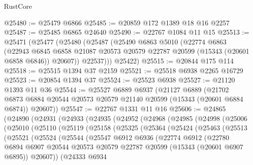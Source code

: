 \begin{lexlean}{RustCore}
\begin{coremodule}
@25480 := @25479 @6866
@25485 := @20859 @172 @1389 @18 @16 @2257
@25487 := @25485 @6865 @24640
@25490 := @22767 @1084 @11 @15
@25513 := @25471
    (@25477
      (@25480
        (@25487
          (@25490
            @6863
            @5010
            (@22774
              @6863
              (@22943
                @6845
                @6858
                @21087
                @20573
                @20579
                @22787
                @20599
                (@15343 (@20601 @6858 @6846))
                @20607))
            @22537)))
      @25422)
@25515 := @20844 @175 @114
@25518 := @25515 @1394 @37 @2159
@25521 := @25518 @6938 @2265 @16729
@25523 := @20854 @1394 @37
@25524 := @25523 @6938
@25527 := @21120 @1393 @11 @36
@25544 := @25527
    @6889
    @6937
    (@21127
      @6889
      (@21702 @6873 @6884 @20544 @20573 @20579 @21140 @20599 (@15343 (@20601 @6884 @6874)) @20607))
@25547 := @22767 @1331 @11 @16
@25606 := @24865
    (@24890
      (@24931
        (@24933
          (@24935
            (@24952
              (@24968
                (@24985
                  (@24998
                    (@25006
                      (@25010
                        (@25110
                          (@25119
                            (@25158
                              (@25325
                                (@25364
                                  (@25424
                                    (@25463
                                      (@25513
                                        (@25521
                                          (@25524
                                            (@25544
                                              (@25547
                                                @6912
                                                @6936
                                                (@22774
                                                  @6912
                                                  (@22780
                                                    @6894
                                                    @6907
                                                    @20544
                                                    @20573
                                                    @20579
                                                    @22787
                                                    @20599
                                                    (@15343 (@20601 @6907 @6895))
                                                    @20607))
                                                (@24333
                                                  @6934

\end{coremodule}
\end{lexlean}
